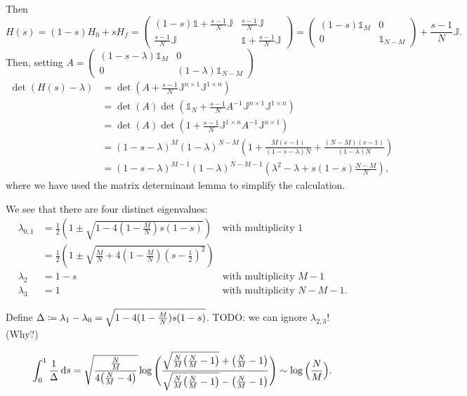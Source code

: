Then
\[ H(s) = (1-s)H_0 + sH_f = \begin{pmatrix}
(1-s)\mathbb{1} +\frac{s-1}{N}\mathbb{J} & \frac{s-1}{N}\mathbb{J} \\
\frac{s-1}{N}\mathbb{J} & \mathbb{1} + \frac{s-1}{N}\mathbb{J}
\end{pmatrix} = \begin{pmatrix}
(1-s)\mathbb{1}_M & 0 \\ 0 & \mathbb{1}_{N-M}
\end{pmatrix} + \frac{s-1}{N}\mathbb{J}. \]
Then, setting $A = \begin{pmatrix}
(1-s-\lambda)\mathbb{1}_M & 0 \\ 0 & (1-\lambda)\mathbb{1}_{N-M}
\end{pmatrix}$
\begin{align*}
\det(H(s)-\lambda) &= \det \left(A + \frac{s-1}{N}\mathbb{J}^{n\times 1}\mathbb{J}^{1\times n}\right) \\
&= \det(A)\det \left(\mathbb{1}_N + \frac{s-1}{N}A^{-1}\mathbb{J}^{n\times 1}\mathbb{J}^{1\times n}\right) \\
&= \det(A)\det \left(1 + \frac{s-1}{N}\mathbb{J}^{1\times n}A^{-1}\mathbb{J}^{n\times 1}\right) \\
&= (1-s-\lambda)^{M}(1-\lambda)^{N-M}\left(1 + \frac{M(s-1)}{(1-s-\lambda)N} + \frac{(N-M)(s-1)}{(1-\lambda)N}\right) \\
&= (1-s-\lambda)^{M-1}(1-\lambda)^{N-M-1}\left(\lambda^2 - \lambda + s(1-s)\frac{N-M}{N}\right),
\end{align*}
where we have used the matrix determinant lemma to simplify the calculation.

We see that there are four distinct eigenvalues:
\begin{align*}
\lambda_{0,1} &= \frac{1}{2}\left(1\pm \sqrt{1-4(1- \frac{M}{N})s(1-s)}\right) &\text{with multiplicity $1$} \\
&= \frac{1}{2}\left(1\pm \sqrt{\frac{M}{N}+4(1- \frac{M}{N})(s-\frac{1}{2})^2}\right) \\
\lambda_{2} &= 1-s &\text{with multiplicity $M-1$}\\
\lambda_{3} &= 1 &\text{with multiplicity $N-M-1$.}
\end{align*}

Define $\Delta \coloneqq \lambda_1-\lambda_0 = \sqrt{1-4(1- \frac{M}{N})s(1-s)}$.
TODO: we can ignore $\lambda_{2,3}$! (Why?)

\begin{lemma}
\[ \int_0^1 \frac{1}{\Delta}\operatorname{d \!}{s} = \sqrt{\frac{\frac{N}{M}}{4\big(\frac{N}{M}-4\big)}}\log\Bigg(\frac{\sqrt{\frac{N}{M}\big(\frac{N}{M}-1\big)}+ \big(\frac{N}{M}-1\big)}{\sqrt{\frac{N}{M}\big(\frac{N}{M}-1\big)}- \big(\frac{N}{M}-1\big)}\Bigg) \sim \log\Big(\frac{N}{M}\Big). \]
\end{lemma}

